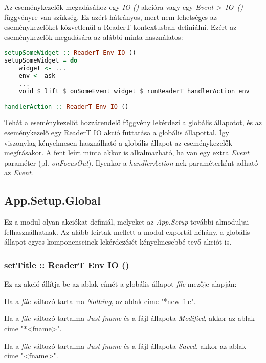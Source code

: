 Az eseménykezelők megadásához egy \textit{IO ()} akcióra vagy egy \mbox{\textit{Event-> IO ()}} függvényre van szükség. Ez azért hátrányos, mert nem lehetséges az eseménykezelőket közvetlenül a ReaderT kontextusban definiálni. Ezért az eseménykezelők megadására az alábbi minta használatos:

\begin{lstlisting}[language={Haskell}]
setupSomeWidget :: ReaderT Env IO ()
setupSomeWidget = do
	widget <- ...
	env <- ask
	...
	void $ lift $ onSomeEvent widget $ runReaderT handlerAction env
	
handlerAction :: ReaderT Env IO ()
\end{lstlisting}

Tehát a eseménykezelőt hozzárendelő függvény lekérdezi a globális állapotot, és az eseménykezelő egy ReaderT IO akció futtatása a globális állapottal. Így viszonylag kényelmesen használható a globális állapot az eseménykezelők megírásakor. A fent leírt minta akkor is alkalmazható, ha van egy extra \textit{Event} paraméter (pl. \textit{onFocusOut}).  Ilyenkor a \textit{handlerAction}-nek paraméterként adható az \textit{Event}.

\subsection{App.Setup.Global}

Ez a modul olyan akciókat definiál, melyeket az \textit{App.Setup} további almoduljai felhasználhatnak. Az alább leírtak mellett a modul exportál néhány, a globális állapot egyes komponenseinek lekérdezését kényelmesebbé tevő akciót is.

\subsubsection{setTitle :: ReaderT Env IO ()}

Ez az akció állítja be az ablak címét a globális állapot \textit{file} mezője alapján:
\begin{compactenum}
	\item Ha a \textit{file} változó tartalma \textit{Nothing}, az ablak címe "*new file".
	\item Ha a \textit{file} változó tartalma \textit{Just fname} és a fájl állapota \textit{Modified}, akkor az ablak címe "*<fname>".
	\item Ha a \textit{file} változó tartalma \textit{Just fname} és a fájl állapota \textit{Saved}, akkor az ablak címe "<fname>".
\end{compactenum}

